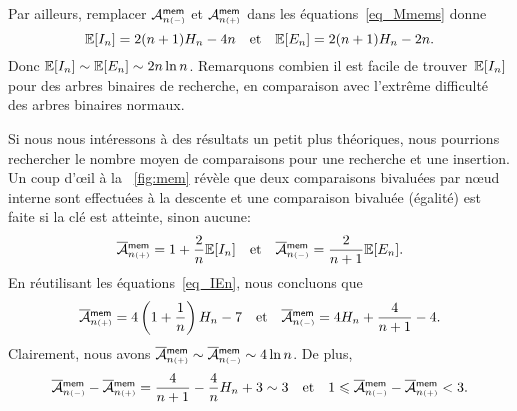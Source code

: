 Par ailleurs, remplacer \(\M{\fun{mem}}{n{\scriptscriptstyle
    (-)}}\) et \(\M{\fun{mem}}{n{\scriptscriptstyle (+)}}\) dans
les équations~\eqref{eq_Mmems} donne
\begin{equation}
\Expected{I_n} = 2(n+1)H_n - 4n
\quad\text{et}\quad
\Expected{E_n} = 2(n+1)H_n - 2n.
\label{eq_IEn}
\end{equation}
Donc \(\Expected{I_n} \sim \Expected{E_n} \sim 2n\ln n\). Remarquons
combien il est facile de trouver~\(\Expected{I_n}\) pour des arbres
binaires de recherche, en comparaison avec l'extrême difficulté des
arbres binaires normaux.

Si nous nous intéressons à des résultats un petit plus théoriques,
nous pourrions rechercher le nombre moyen de comparaisons pour une
recherche et une insertion. Un coup d'{\oe}il à la \fig~\vref{fig:mem}
révèle que deux comparaisons bivaluées par n{\oe}ud interne sont
effectuées à la descente et une comparaison bivaluée (égalité) est
faite si la clé est atteinte, sinon aucune:
\begin{equation}
\OM{\fun{mem}}{n{\scriptscriptstyle(+)}}
  = 1 + \frac{2}{n}\Expected{I_n}
\quad\text{et}\quad
\OM{\fun{mem}}{n{\scriptscriptstyle(-)}}
  = \frac{2}{n+1}\Expected{E_n}.
\label{eq_Mmem_cmp1}
\end{equation}
En réutilisant les équations~\eqref{eq_IEn}, nous concluons que
\begin{equation}
\OM{\fun{mem}}{n{\scriptscriptstyle(+)}}
  = 4\left(1+\frac{1}{n}\right)H_n - 7
\quad\text{et}\quad
\OM{\fun{mem}}{n{\scriptscriptstyle(-)}}
  = 4H_n + \frac{4}{n+1} - 4.
\index{mem@$\OM{\fun{mem}}{n{\scriptscriptstyle(-)}}$}
\index{mem@$\OM{\fun{mem}}{n{\scriptscriptstyle(+)}}$}
\label{eq_Mmem_cmp2}
\end{equation}
Clairement, nous avons \(\OM{\fun{mem}}{n{\scriptscriptstyle(+)}} \sim
\OM{\fun{mem}}{n{\scriptscriptstyle(-)}} \sim 4\ln n\). De plus,
\begin{equation*}
\OM{\fun{mem}}{n{\scriptscriptstyle (-)}} -
\OM{\fun{mem}}{n{\scriptscriptstyle (+)}} =
\frac{4}{n+1} - \frac{4}{n}H_n + 3 \sim 3
\quad\text{et}\quad
1 \leqslant \OM{\fun{mem}}{n{\scriptscriptstyle (-)}} -
\OM{\fun{mem}}{n{\scriptscriptstyle (+)}} < 3.
\end{equation*}

